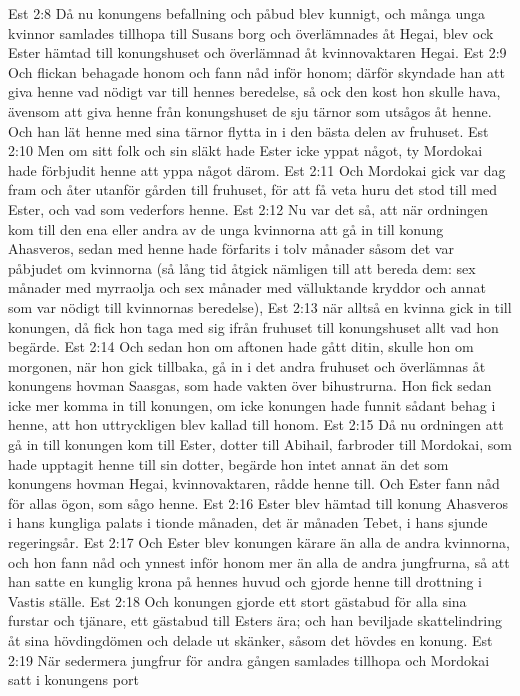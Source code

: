 Est 2:8  Då nu konungens befallning och påbud blev kunnigt, och många unga kvinnor samlades tillhopa till Susans borg och överlämnades åt Hegai, blev ock Ester hämtad till konungshuset och överlämnad åt kvinnovaktaren Hegai.
Est 2:9  Och flickan behagade honom och fann nåd inför honom; därför skyndade han att giva henne vad nödigt var till hennes beredelse, så ock den kost hon skulle hava, ävensom att giva henne från konungshuset de sju tärnor som utsågos åt henne. Och han lät henne med sina tärnor flytta in i den bästa delen av fruhuset.
Est 2:10  Men om sitt folk och sin släkt hade Ester icke yppat något, ty Mordokai hade förbjudit henne att yppa något därom.
Est 2:11  Och Mordokai gick var dag fram och åter utanför gården till fruhuset, för att få veta huru det stod till med Ester, och vad som vederfors henne.
Est 2:12  Nu var det så, att när ordningen kom till den ena eller andra av de unga kvinnorna att gå in till konung Ahasveros, sedan med henne hade förfarits i tolv månader såsom det var påbjudet om kvinnorna (så lång tid åtgick nämligen till att bereda dem: sex månader med myrraolja och sex månader med välluktande kryddor och annat som var nödigt till kvinnornas beredelse),
Est 2:13  när alltså en kvinna gick in till konungen, då fick hon taga med sig ifrån fruhuset till konungshuset allt vad hon begärde.
Est 2:14  Och sedan hon om aftonen hade gått ditin, skulle hon om morgonen, när hon gick tillbaka, gå in i det andra fruhuset och överlämnas åt konungens hovman Saasgas, som hade vakten över bihustrurna. Hon fick sedan icke mer komma in till konungen, om icke konungen hade funnit sådant behag i henne, att hon uttryckligen blev kallad till honom.
Est 2:15  Då nu ordningen att gå in till konungen kom till Ester, dotter till Abihail, farbroder till Mordokai, som hade upptagit henne till sin dotter, begärde hon intet annat än det som konungens hovman Hegai, kvinnovaktaren, rådde henne till. Och Ester fann nåd för allas ögon, som sågo henne.
Est 2:16  Ester blev hämtad till konung Ahasveros i hans kungliga palats i tionde månaden, det är månaden Tebet, i hans sjunde regeringsår.
Est 2:17  Och Ester blev konungen kärare än alla de andra kvinnorna, och hon fann nåd och ynnest inför honom mer än alla de andra jungfrurna, så att han satte en kunglig krona på hennes huvud och gjorde henne till drottning i Vastis ställe.
Est 2:18  Och konungen gjorde ett stort gästabud för alla sina furstar och tjänare, ett gästabud till Esters ära; och han beviljade skattelindring åt sina hövdingdömen och delade ut skänker, såsom det hövdes en konung.
Est 2:19  När sedermera jungfrur för andra gången samlades tillhopa och Mordokai satt i konungens port
